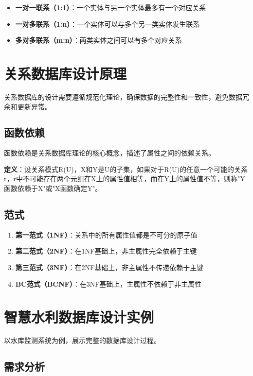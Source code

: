 \begin{itemize}
    \item \textbf{一对一联系（1:1）}：一个实体与另一个实体最多有一个对应关系
    \item \textbf{一对多联系（1:n）}：一个实体可以与多个另一类实体发生联系
    \item \textbf{多对多联系（m:n）}：两类实体之间可以有多个对应关系
\end{itemize}

\section{关系数据库设计原理}

关系数据库的设计需要遵循规范化理论，确保数据的完整性和一致性，避免数据冗余和更新异常。

\subsection{函数依赖}

函数依赖是关系数据库理论的核心概念，描述了属性之间的依赖关系。

\textbf{定义}：设关系模式R(U)，X和Y是U的子集，如果对于R(U)的任意一个可能的关系r，r中不可能存在两个元组在X上的属性值相等，而在Y上的属性值不等，则称"Y函数依赖于X"或"X函数确定Y"。

\subsection{范式}

\begin{enumerate}
    \item \textbf{第一范式（1NF）}：关系中的所有属性值都是不可分的原子值
    \item \textbf{第二范式（2NF）}：在1NF基础上，非主属性完全依赖于主键
    \item \textbf{第三范式（3NF）}：在2NF基础上，非主属性不传递依赖于主键
    \item \textbf{BC范式（BCNF）}：在3NF基础上，主属性不依赖于非主属性
\end{enumerate}

\section{智慧水利数据库设计实例}

以水库监测系统为例，展示完整的数据库设计过程。

\subsection{需求分析}

